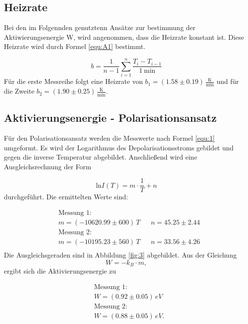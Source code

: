 \subsection{Heizrate}
\label{sec:Heizrate}

Bei den im Folgennden genutztenn Ansätze zur bestimmung der Aktiwierungsenergie W, wird angenommen, dass die Heizrate konstant ist.
Diese Heizrate wird durch Formel \ref{equ:A1} bestimmt.

\begin{equation}
    b = \frac{1}{n-1} \sum_{i=1}^{n} \frac{T_i - T_{i-1}}{\SI{1}{\minute}}
    \label{equ:A1}
\end{equation}
Für die erste Messreihe folgt eine Heizrate von $b_1 = (1.58 \pm 0.19) \,\frac{\text{K}}{\text{min}}$ und für die Zweite $b_2 = (1.90 \pm 0.25) \,\frac{\text{K}}{\text{min}}$.




\subsection{Aktivierungsenergie - Polarisationsansatz}
\label{sec:pol}

Für den Polarisationsansatz werden die Messwerte nach Formel \ref{equ:1} umgeformt. 
Es wird der Logarithmus des Depolarisationsstroms gebildet und gegen die inverse Temperatur abgebildet.
Anschließend wird eine Ausgleichsrechnung der Form 

\begin{equation}
    \text{ln} I(T) = m \cdot \frac{1}{T} + n
\end{equation}
durchgeführt.
Die ermittelten Werte sind:

\begin{align*}
    &\text{Messung 1:}\\
    & m = (-10620.99 \pm 600) \,T    &&  n = 45.25 \pm 2.44   \\
    &\text{Messung 2:}\\
    & m = (-10195.23 \pm 560) \,T    &&  n = 33.56 \pm 4.26   \\
\end{align*}
Die Ausgleichsgeraden sind in Abbildung \ref{fig:3} abgebildet.
Aus der Gleichung 
\begin{equation}
    W = -k_B \cdot m,
    \label{equ:A2}
\end{equation}
ergibt sich die Aktivierungsenergie zu

\begin{align*}
    &\text{Messung 1:}\\
    & W = (0.92 \pm 0.05) \,eV  \\
    &\text{Messung 2:}\\
    & W = (0.88 \pm 0.05) \,eV.  \\
\end{align*}

